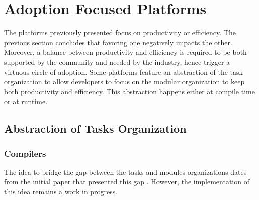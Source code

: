 \section{Adoption Focused Platforms} \label{chapter3:software-adoption}

The platforms previously presented focus on productivity or efficiency.
The previous section concludes that favoring one negatively impacts the other.
Moreover, a balance between productivity and efficiency is required to be both supported by the community and needed by the industry, hence trigger a virtuous circle of adoption.
Some platforms feature an abstraction of the task organization to allow developers to focus on the modular organization to keep both productivity and efficiency.
This abstraction happens either at compile time or at runtime.


\begin{figure}[h!]
%
\end{figure}

\subsection{Abstraction of Tasks Organization}

\subsubsection{Compilers} \label{chapter3:software-adoption:compilers}


The idea to bridge the gap between the tasks and modules organizations dates from the initial paper that presented this gap \cite{Parnas1972}.
However, the implementation of this idea remains a work in progress.

